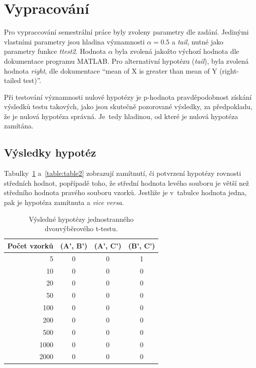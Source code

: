 \section{Vypracování}

Pro vypraccování semestrální práce byly zvoleny parametry dle zadání.
Jedinými vlastními parametry jsou hladina významnosti \( \alpha = 0.5\) a \textit{tail}, nutné jako parametry funkce \textit{ttest2}.
Hodnota \( \alpha \) byla zvolená jakožto výchozí hodnota dle dokumentace programu MATLAB.
Pro alternativní hypotézu (\textit{tail}), byla zvolená hodnota \textit{right}, dle dokumentace \enquote{mean of X is greater than mean of Y (right-tailed test)}.

Při testování významnosti nulové hypotézy je p-hodnota pravděpodobnost získání výsledků testu takových, jako jsou skutečně pozorované výsledky, za předpokladu, že je nulová hypotéza správná.
Je~tedy hladinou, od které je nulová hypotéza zamítána.

\subsection{Výsledky hypotéz}

Tabulky~\ref{table:table1} a~\ref{table:table2} zobrazují zamítnutí, či potvrzení hypotézy rovnosti středních hodnot, popřípadě toho, že střední hodnota levého souboru je větší než středního hodnota pravého souboru vzorků.
Jestliže je v~tabulce hodnota jedna, pak je hypotéza zamítnuta a \textit{vice versa}.

\begin{table}[htb]
    \centering

    \begin{tabular}{rccc}
        \toprule

        Počet vzorků    & (A', B')  & (A', C') & (B', C')   \\ \midrule
           5            & 0         & 0        & 1          \\
          10            & 0         & 0        & 0          \\
          20            & 0         & 0        & 0          \\
          50            & 0         & 0        & 0          \\
         100            & 0         & 0        & 0          \\
         200            & 0         & 0        & 0          \\
         500            & 0         & 0        & 0          \\
        1000            & 0         & 0        & 0          \\
        2000            & 0         & 0        & 0          \\

        \bottomrule
    \end{tabular}

    \caption{Výsledné hypotézy jednostranného dvouvýběrového t-testu.}
    \label{table:table1}
\end{table}
\FloatBarrier

